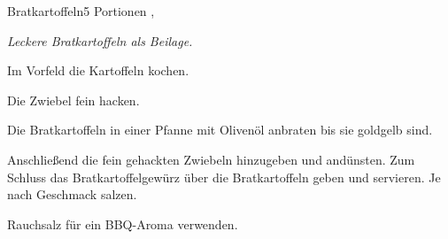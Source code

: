 \documentclass[../recipe-collections/cooking.tex]{subfiles}
\begin{document}
\begin{recipe}{Bratkartoffeln}{5 Portionen }{, }

  \freeform{}\textit{Leckere Bratkartoffeln als Beilage.}


  Im Vorfeld die Kartoffeln kochen.


  Die Zwiebel fein hacken.


  Die Bratkartoffeln in einer Pfanne mit Olivenöl anbraten bis sie goldgelb sind.


  Anschließend die fein gehackten Zwiebeln hinzugeben und andünsten.
  Zum Schluss das Bratkartoffelgewürz über die Bratkartoffeln geben und servieren.
  Je nach Geschmack salzen.

  \freeform{}\hrulefill{}

  \freeform{}
  Rauchsalz für ein BBQ-Aroma verwenden.

\end{recipe}
\end{document}
